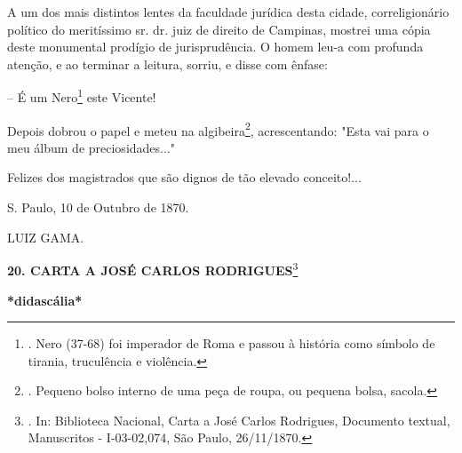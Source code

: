 A um dos mais distintos lentes da faculdade jurídica desta cidade,
correligionário político do meritíssimo sr. dr. juiz de direito de
Campinas, mostrei uma cópia deste monumental prodígio de jurisprudência.
O homem leu-a com profunda atenção, e ao terminar a leitura, sorriu, e
disse com ênfase:

-- É um Nero\footnote{. Nero (37-68) foi imperador de Roma e passou à
  história como símbolo de tirania, truculência e violência.} este
Vicente!

Depois dobrou o papel e meteu na algibeira\footnote{. Pequeno bolso
  interno de uma peça de roupa, ou pequena bolsa, sacola.},
acrescentando: "Esta vai para o meu álbum de preciosidades..."

Felizes dos magistrados que são dignos de tão elevado conceito!...

S. Paulo, 10 de Outubro de 1870.

LUIZ GAMA.

\textbf{20. CARTA A JOSÉ CARLOS RODRIGUES}\footnote{. In: Biblioteca
  Nacional, Carta a José Carlos Rodrigues, Documento textual,
  Manuscritos - I-03-02,074, São Paulo, 26/11/1870.}

\textbf{*didascália*}

